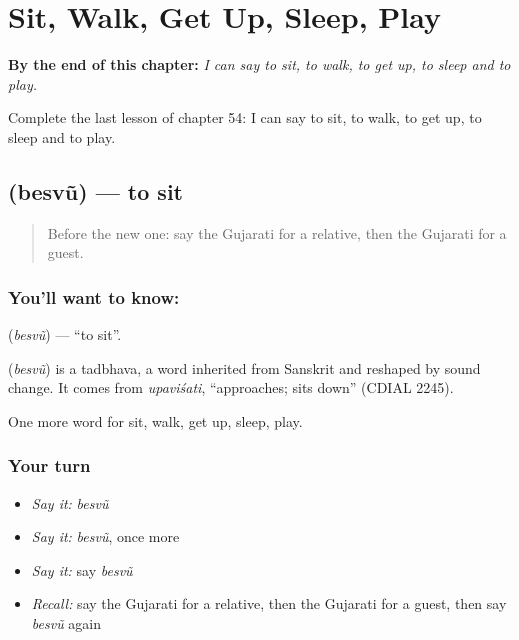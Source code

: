 
\chapter{Sit, Walk, Get Up, Sleep, Play}
\label{ch:gu-sit-walk-get-up-sleep-play}

\begin{chapteropening}
\textbf{By the end of this chapter:} \emph{I can say to sit, to walk, to get up, to sleep and to play.}

Complete the last lesson of chapter 54: I can say to sit, to walk, to get up, to sleep and to play.
\end{chapteropening}

\section[\texorpdfstring{\gu{બેસવું} (besvũ)}{બેસવું (besvũ)}]{ (besvũ) — to sit}

\label{lesson:GU-C54-besvu}



\begin{quote}
Before the new one: say the Gujarati for a relative, then the Gujarati for a guest.
\end{quote}

\subsection*{You'll want to know: }
\textbf{} (\emph{besvũ}) — \textquotedblleft{}to sit\textquotedblright{}.

\begin{cousinweb}
\textbf{} (\emph{besvũ}) is a tadbhava, a word inherited from Sanskrit and reshaped by sound change. It comes from \emph{upaviśati}, \textquotedblleft{}approaches; sits down\textquotedblright{} (CDIAL 2245).
\end{cousinweb}

\begin{grammarlens}[title={What you've built}]
One more word for sit, walk, get up, sleep, play.
\end{grammarlens}

\subsection*{Your turn}
\begin{itemize}
\raggedright
  \item \emph{Say it:} \emph{besvũ}
  \item \emph{Say it:} \emph{besvũ}, once more
  \item \emph{Say it:} say \emph{besvũ}
  \item \emph{Recall:} say the Gujarati for a relative, then the Gujarati for a guest, then say \emph{besvũ} again
\end{itemize}

